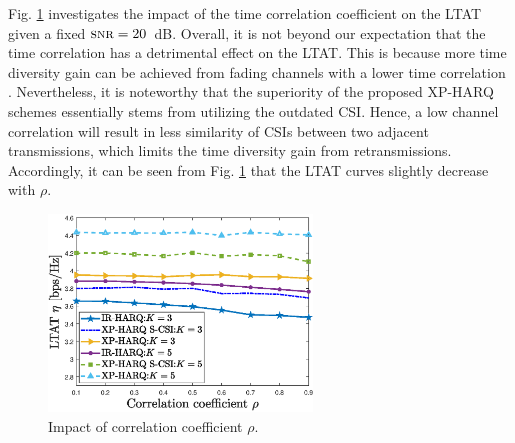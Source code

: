 \documentclass[lettersize,journal]{IEEEtran}
\begin{document}
%

%
%

Fig. \ref{Fig.Throughput_Rho} investigates the impact of the time correlation coefficient on the LTAT given a fixed ${ \textsc{snr}} = 20$~dB. Overall, it is not beyond our expectation that the time correlation has a detrimental effect on the LTAT. This is because more time diversity gain can be achieved from fading channels with a lower time correlation \cite{7959548}. Nevertheless, it is noteworthy that the superiority of the proposed XP-HARQ schemes essentially stems from utilizing the outdated CSI. Hence, a low channel correlation will result in less similarity of CSIs between two adjacent transmissions, which limits the time diversity gain from retransmissions. Accordingly, it can be seen from Fig. \ref{Fig.Throughput_Rho} that the LTAT curves slightly decrease with $\rho$.

%

\begin{figure}[htbp]
    \centering
    \includegraphics[width=7cm]{Throughput_Rho.eps}
    \caption{Impact of correlation coefficient $\rho$.}
    \label{Fig.Throughput_Rho} %
\end{figure}
\end{document}
